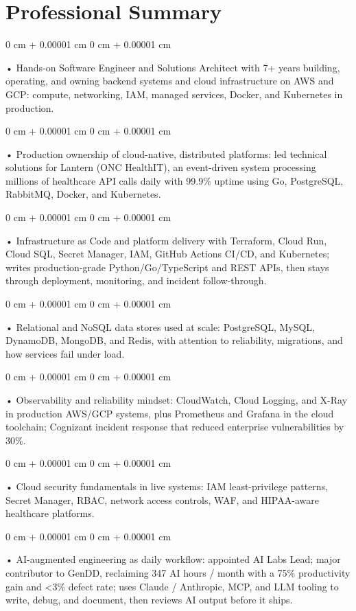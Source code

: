 \documentclass[10pt, letterpaper]{article}
\newenvironment{onecolentry}{
    \begin{adjustwidth}{
        0 cm + 0.00001 cm
    }{
        0 cm + 0.00001 cm
    }
}{
    \end{adjustwidth}
} %
\begin{document}
    \section{Professional Summary}
        \vspace{2 pt }
        \begin{onecolentry}
            • Hands-on Software Engineer and Solutions Architect with 7+ years building, operating, and owning backend systems and cloud infrastructure on AWS and GCP: compute, networking, IAM, managed services, Docker, and Kubernetes in production.
        \end{onecolentry}
        \begin{onecolentry}
            • Production ownership of cloud-native, distributed platforms: led technical solutions for Lantern (ONC HealthIT), an event-driven system processing millions of healthcare API calls daily with 99.9\% uptime using Go, PostgreSQL, RabbitMQ, Docker, and Kubernetes.
        \end{onecolentry}
        \begin{onecolentry}
            • Infrastructure as Code and platform delivery with Terraform, Cloud Run, Cloud SQL, Secret Manager, IAM, GitHub Actions CI/CD, and Kubernetes; writes production-grade Python/Go/TypeScript and REST APIs, then stays through deployment, monitoring, and incident follow-through.
        \end{onecolentry}
        \begin{onecolentry}
            • Relational and NoSQL data stores used at scale: PostgreSQL, MySQL, DynamoDB, MongoDB, and Redis, with attention to reliability, migrations, and how services fail under load.
        \end{onecolentry}
        \begin{onecolentry}
            • Observability and reliability mindset: CloudWatch, Cloud Logging, and X-Ray in production AWS/GCP systems, plus Prometheus and Grafana in the cloud toolchain; Cognizant incident response that reduced enterprise vulnerabilities by 30\%.
        \end{onecolentry}
        \begin{onecolentry}
            • Cloud security fundamentals in live systems: IAM least-privilege patterns, Secret Manager, RBAC, network access controls, WAF, and HIPAA-aware healthcare platforms.
        \end{onecolentry}
        \begin{onecolentry}
            • AI-augmented engineering as daily workflow: appointed AI Labs Lead; major contributor to GenDD, reclaiming 347 AI hours / month with a 75\% productivity gain and <3\% defect rate; uses Claude / Anthropic, MCP, and LLM tooling to write, debug, and document, then reviews AI output before it ships.
        \end{onecolentry}
\end{document}
